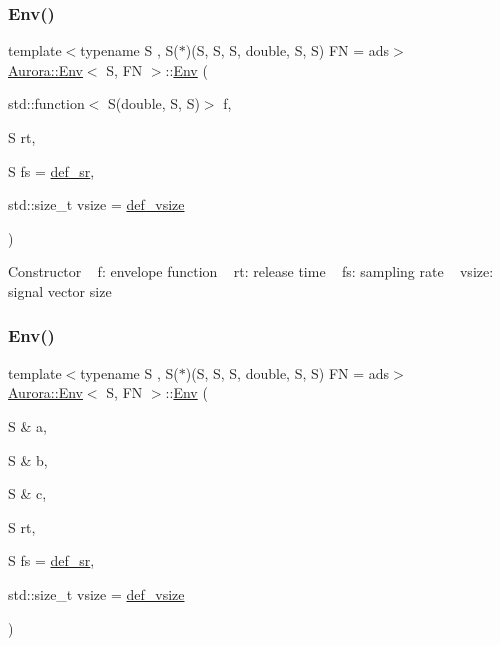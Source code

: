 \subsubsection{\texorpdfstring{Env()}{Env()}\hspace{0.1cm}{\footnotesize\ttfamily [1/3]}}
{\footnotesize\ttfamily template$<$typename S , S($\ast$)(\+S, S, S, double, S, S) FN = ads$>$ \\
\hyperlink{class_aurora_1_1_env}{Aurora\+::\+Env}$<$ S, FN $>$\+::\hyperlink{class_aurora_1_1_env}{Env} (\begin{DoxyParamCaption}\item[{std\+::function$<$ S(double, S, S)$>$}]{f,  }\item[{S}]{rt,  }\item[{S}]{fs = {\ttfamily \hyperlink{namespace_aurora_ad49263d809bea98dd422e95bc91bc03e}{def\+\_\+sr}},  }\item[{std\+::size\+\_\+t}]{vsize = {\ttfamily \hyperlink{namespace_aurora_afaaddf667a06e7ce23c667a8b7295263}{def\+\_\+vsize}} }\end{DoxyParamCaption})\hspace{0.3cm}{\ttfamily [inline]}}

Constructor ~\newline
f\+: envelope function ~\newline
rt\+: release time ~\newline
fs\+: sampling rate ~\newline
vsize\+: signal vector size \mbox{\label{class_aurora_1_1_env_a3ea4ee867e90f80331819cceacc55942}} 
\subsubsection{\texorpdfstring{Env()}{Env()}\hspace{0.1cm}{\footnotesize\ttfamily [2/3]}}
{\footnotesize\ttfamily template$<$typename S , S($\ast$)(\+S, S, S, double, S, S) FN = ads$>$ \\
\hyperlink{class_aurora_1_1_env}{Aurora\+::\+Env}$<$ S, FN $>$\+::\hyperlink{class_aurora_1_1_env}{Env} (\begin{DoxyParamCaption}\item[{S \&}]{a,  }\item[{S \&}]{b,  }\item[{S \&}]{c,  }\item[{S}]{rt,  }\item[{S}]{fs = {\ttfamily \hyperlink{namespace_aurora_ad49263d809bea98dd422e95bc91bc03e}{def\+\_\+sr}},  }\item[{std\+::size\+\_\+t}]{vsize = {\ttfamily \hyperlink{namespace_aurora_afaaddf667a06e7ce23c667a8b7295263}{def\+\_\+vsize}} }\end{DoxyParamCaption})\hspace{0.3cm}{\ttfamily [inline]}}

